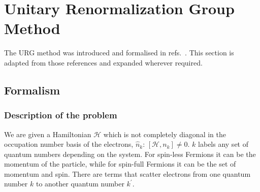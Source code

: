\chapter{Unitary Renormalization Group Method}\label{urgform}
The URG method was introduced and formalised in refs.~\cite{anirbanurg1,anirbanurg2,anirbanmott1,anirbanmott2}.  This section is adapted from those references and expanded wherever required.
\section{Formalism}
\subsection{Description of the problem}
We are given a Hamiltonian \(\mathcal{H}\) which is not completely diagonal in the occupation number basis of the electrons, \(\hat n_k\): \(\left[\mathcal{H},n_k\right] \neq 0\). \(k\) labels any set of quantum numbers depending on the system. For spin-less Fermions it can be the momentum of the particle, while for spin-full Fermions it can be the set of momentum and spin. There are terms that scatter electrons from one quantum number \(k\) to another quantum number \(k^\prime\).

